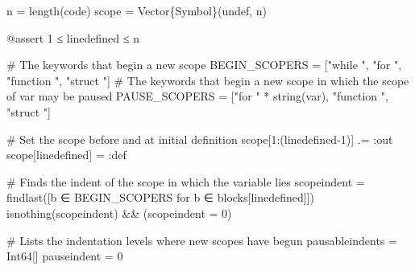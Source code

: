 \documentclass[
  letterpaper,
  DIV=11,
  numbers=noendperiod]{scrreprt}
\newenvironment{Shaded}{\begin{snugshade}}{\end{snugshade}}
\newcommand{\CommentTok}[1]{\textcolor[rgb]{0.37,0.37,0.37}{#1}}
\newcommand{\ConstantTok}[1]{\textcolor[rgb]{0.56,0.35,0.01}{#1}}
\newcommand{\DataTypeTok}[1]{\textcolor[rgb]{0.68,0.00,0.00}{#1}}
\newcommand{\FloatTok}[1]{\textcolor[rgb]{0.68,0.00,0.00}{#1}}
\newcommand{\FunctionTok}[1]{\textcolor[rgb]{0.28,0.35,0.67}{#1}}
\newcommand{\NormalTok}[1]{\textcolor[rgb]{0.00,0.23,0.31}{#1}}
\newcommand{\OperatorTok}[1]{\textcolor[rgb]{0.37,0.37,0.37}{#1}}
\newcommand{\PreprocessorTok}[1]{\textcolor[rgb]{0.68,0.00,0.00}{#1}}
\newcommand{\StringTok}[1]{\textcolor[rgb]{0.13,0.47,0.30}{#1}}
\begin{document}
\begin{Shaded}
\begin{Highlighting}[]
\NormalTok{    n }\OperatorTok{=} \FunctionTok{length}\NormalTok{(code)}
\NormalTok{    scope }\OperatorTok{=} \FunctionTok{Vector}\DataTypeTok{\{Symbol\}}\NormalTok{(}\ConstantTok{undef}\NormalTok{, n)}

    \PreprocessorTok{@assert} \FloatTok{1} \OperatorTok{≤}\NormalTok{ linedefined }\OperatorTok{≤}\NormalTok{ n}

    \CommentTok{\# The keywords that begin a new scope}
\NormalTok{    BEGIN\_SCOPERS }\OperatorTok{=}\NormalTok{ [}\StringTok{"while "}\NormalTok{, }\StringTok{"for "}\NormalTok{, }\StringTok{"function "}\NormalTok{, }\StringTok{"struct "}\NormalTok{]}
    \CommentTok{\# The keywords that begin a new scope in which the scope of \textasciigrave{}var\textasciigrave{} may be paused}
\NormalTok{    PAUSE\_SCOPERS }\OperatorTok{=}\NormalTok{ [}\StringTok{"for "} \OperatorTok{*} \FunctionTok{string}\NormalTok{(var), }\StringTok{"function "}\NormalTok{, }\StringTok{"struct "}\NormalTok{]}
    
    \CommentTok{\# Set the scope before and at initial definition}
\NormalTok{    scope[}\FloatTok{1}\OperatorTok{:}\NormalTok{(linedefined}\OperatorTok{{-}}\FloatTok{1}\NormalTok{)] }\OperatorTok{.=} \OperatorTok{:}\NormalTok{out}
\NormalTok{    scope[linedefined] }\OperatorTok{=} \OperatorTok{:}\NormalTok{def}

    \CommentTok{\# Finds the indent of the scope in which the variable lies}
\NormalTok{    scopeindent }\OperatorTok{=} \FunctionTok{findlast}\NormalTok{([b }\OperatorTok{∈}\NormalTok{ BEGIN\_SCOPERS for b }\OperatorTok{∈}\NormalTok{ blocks[linedefined]])}
    \FunctionTok{isnothing}\NormalTok{(scopeindent) }\OperatorTok{\&\&}\NormalTok{ (scopeindent }\OperatorTok{=} \FloatTok{0}\NormalTok{)}

    \CommentTok{\# Lists the indentation levels where new scopes have begun}
\NormalTok{    pausableindents }\OperatorTok{=} \DataTypeTok{Int64}\NormalTok{[]}
\NormalTok{    pauseindent }\OperatorTok{=} \FloatTok{0} 
    

\end{Highlighting}
\end{Shaded}
\end{document}
